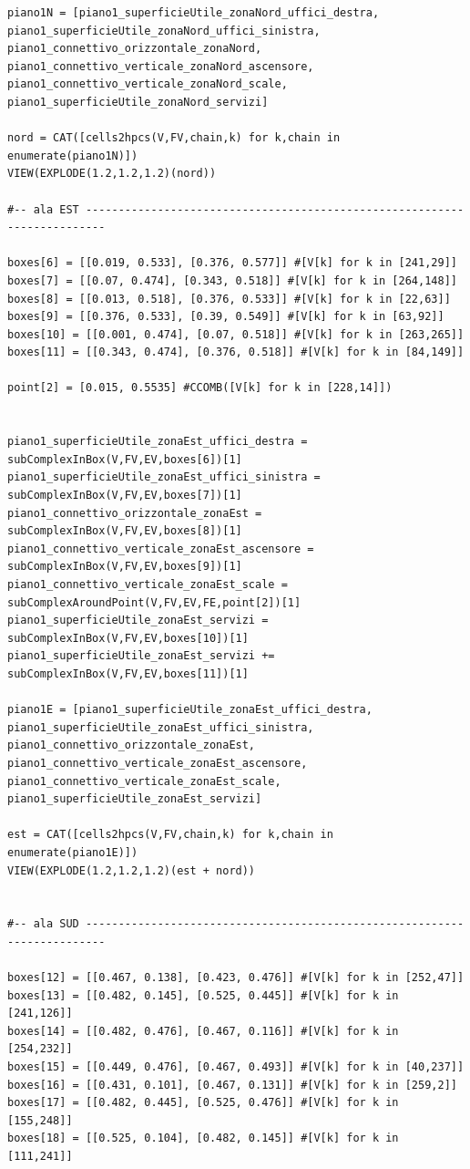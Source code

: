\documentclass[11pt, oneside]{article}   	%
\begin{document}
\begin{verbatim}
piano1N = [piano1_superficieUtile_zonaNord_uffici_destra, piano1_superficieUtile_zonaNord_uffici_sinistra, piano1_connettivo_orizzontale_zonaNord, piano1_connettivo_verticale_zonaNord_ascensore, piano1_connettivo_verticale_zonaNord_scale, piano1_superficieUtile_zonaNord_servizi]
    
nord = CAT([cells2hpcs(V,FV,chain,k) for k,chain in enumerate(piano1N)])
VIEW(EXPLODE(1.2,1.2,1.2)(nord))

#-- ala EST -------------------------------------------------------------------------

boxes[6] = [[0.019, 0.533], [0.376, 0.577]] #[V[k] for k in [241,29]]
boxes[7] = [[0.07, 0.474], [0.343, 0.518]] #[V[k] for k in [264,148]]
boxes[8] = [[0.013, 0.518], [0.376, 0.533]] #[V[k] for k in [22,63]]
boxes[9] = [[0.376, 0.533], [0.39, 0.549]] #[V[k] for k in [63,92]]
boxes[10] = [[0.001, 0.474], [0.07, 0.518]] #[V[k] for k in [263,265]]
boxes[11] = [[0.343, 0.474], [0.376, 0.518]] #[V[k] for k in [84,149]]

point[2] = [0.015, 0.5535] #CCOMB([V[k] for k in [228,14]])


piano1_superficieUtile_zonaEst_uffici_destra = subComplexInBox(V,FV,EV,boxes[6])[1]
piano1_superficieUtile_zonaEst_uffici_sinistra = subComplexInBox(V,FV,EV,boxes[7])[1]
piano1_connettivo_orizzontale_zonaEst = subComplexInBox(V,FV,EV,boxes[8])[1]
piano1_connettivo_verticale_zonaEst_ascensore = subComplexInBox(V,FV,EV,boxes[9])[1]
piano1_connettivo_verticale_zonaEst_scale = subComplexAroundPoint(V,FV,EV,FE,point[2])[1]
piano1_superficieUtile_zonaEst_servizi = subComplexInBox(V,FV,EV,boxes[10])[1]
piano1_superficieUtile_zonaEst_servizi += subComplexInBox(V,FV,EV,boxes[11])[1]

piano1E = [piano1_superficieUtile_zonaEst_uffici_destra, piano1_superficieUtile_zonaEst_uffici_sinistra, piano1_connettivo_orizzontale_zonaEst, piano1_connettivo_verticale_zonaEst_ascensore, piano1_connettivo_verticale_zonaEst_scale, piano1_superficieUtile_zonaEst_servizi]

est = CAT([cells2hpcs(V,FV,chain,k) for k,chain in enumerate(piano1E)])
VIEW(EXPLODE(1.2,1.2,1.2)(est + nord))


#-- ala SUD -------------------------------------------------------------------------

boxes[12] = [[0.467, 0.138], [0.423, 0.476]] #[V[k] for k in [252,47]]
boxes[13] = [[0.482, 0.145], [0.525, 0.445]] #[V[k] for k in [241,126]]
boxes[14] = [[0.482, 0.476], [0.467, 0.116]] #[V[k] for k in [254,232]]
boxes[15] = [[0.449, 0.476], [0.467, 0.493]] #[V[k] for k in [40,237]]
boxes[16] = [[0.431, 0.101], [0.467, 0.131]] #[V[k] for k in [259,2]]
boxes[17] = [[0.482, 0.445], [0.525, 0.476]] #[V[k] for k in [155,248]]
boxes[18] = [[0.525, 0.104], [0.482, 0.145]] #[V[k] for k in [111,241]]


\end{verbatim}
\end{document}
